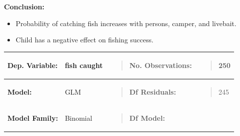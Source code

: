 \textbf{Conclusion:}

\begin{itemize}
\item
  Probability of catching fish increases with persons, camper, and
  livebait.
\item
  Child has a negative effect on fishing success.
\end{itemize}

{\def\LTcaptype{none} %
\begin{longtable}[]{@{}
  >{\raggedright\arraybackslash}p{}
  >{\centering\arraybackslash}p{}
  >{\raggedright\arraybackslash}p{}
  >{\raggedright\arraybackslash}p{}@{}}
\toprule\noalign{}
\begin{minipage}[b]{\linewidth}\raggedright
\textbf{Dep. Variable:}
\end{minipage} & \begin{minipage}[b]{\linewidth}\centering
fish caught
\end{minipage} & \begin{minipage}[b]{\linewidth}\raggedright
\begin{quote}
\textbf{No. Observations:}
\end{quote}
\end{minipage} & \begin{minipage}[b]{\linewidth}\raggedright
\begin{quote}
250
\end{quote}
\end{minipage} \\
\midrule\noalign{}
\endhead
\bottomrule\noalign{}
\endlastfoot
\textbf{Model:} & GLM & \begin{minipage}[t]{\linewidth}\raggedright
\begin{quote}
\textbf{Df Residuals:}
\end{quote}
\end{minipage} & \begin{minipage}[t]{\linewidth}\raggedright
\begin{quote}
245
\end{quote}
\end{minipage} \\
\textbf{Model Family:} & Binomial &
\begin{minipage}[t]{\linewidth}\raggedright
\begin{quote}
\textbf{Df Model:}

\end{quote}
\end{minipage}
\end{longtable}}
